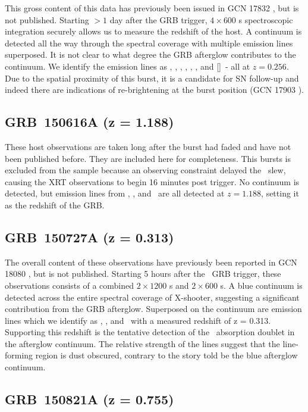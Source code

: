 \documentclass{aa}    %
\begin{document}
This gross content of this data has previously been issued in GCN 17832
\citep{GCN17832}, but is not published. Starting $> 1$ day after the GRB
trigger, $4 \times 600$ s spectroscopic integration securely allows us to
measure the redshift of the host. A continuum is detected all the way through
the spectral coverage with multiple emission lines superposed. It is not clear
to what degree the GRB afterglow contributes to the continuum. We identify the
emission lines as \oii, \hb, \oiii, \ha, \nii, \ha, and [\sii]~- all at $z =
0.256$. Due to the spatial proximity of this burst, it is a candidate for SN
follow-up and indeed there are indications of re-brightening at the burst
position (GCN 17903 \citep{GCN17903}).

\subsection{GRB~150616A (z = 1.188)}\label{150616}

These host observations are taken long after the burst had faded  and have not
been published before. They are included here for completeness. This bursts is
excluded from the sample because an observing constraint delayed the
\swift~slew, causing the XRT observations to begin 16 minutes post trigger. No
continuum is detected, but emission lines from \oii, \oiii, and \ha~are all
detected at $z = 1.188$, setting it as the redshift of the GRB.

\subsection{GRB~150727A (z = 0.313)}\label{150727}

The overall content of these observations have previously been reported in GCN
18080 \citep{GCN18080}, but is not published. Starting 5 hours after the
\swift~GRB trigger, these observations consists of a combined $2 \times 1200$ s
and $2 \times 600$ s. A blue continuum is detected across the entire spectral
coverage of X-shooter, suggesting a significant contribution from the GRB
afterglow. Superposed on the continuum are emission lines which we identify as
\hb, \oiii, and \ha~with a measured redshift of z = 0.313. Supporting this
redshift is the tentative detection of the \mgii~absorption doublet in the
afterglow continuum. The relative strength of the lines suggest that the
line-forming region is dust obscured, contrary to the story told be the blue
afterglow continuum.

\subsection{GRB~150821A (z = 0.755)}\label{150821}
\end{document}
